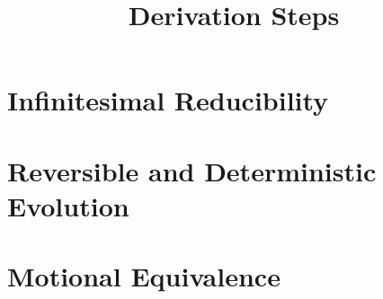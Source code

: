 \documentclass{article}
\begin{document}
\title{Derivation Steps}

\section{Infinitesimal Reducibility}

\section{Reversible and Deterministic Evolution}

\section{Motional Equivalence}
\end{document}
